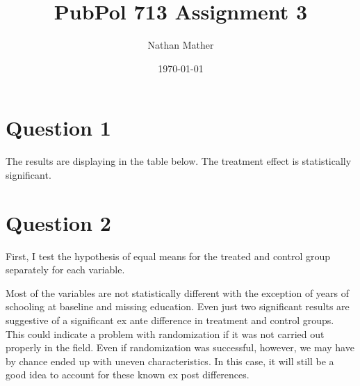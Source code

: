 \documentclass[11pt]{article}
\title{PubPol 713 Assignment 3} %
\author{Nathan Mather} %
\date{\today} %
\begin{document}
	
\maketitle %

\setcounter{tocdepth}{2} %


\section{ Question 1}

The results are displaying in the table below. The treatment effect is statistically significant. 

\begin{center}

	
	
\end{center}



\section{ Question 2}

First, I test the hypothesis of equal means for the treated and control group separately for each variable. 

\begin{center}
	\scalebox{0.80}{	
		
	}
\end{center}

Most of the variables are not statistically different with the exception of years of schooling at baseline and missing education. Even just two significant results are suggestive of a significant ex ante difference in treatment and control groups. This could indicate a problem with randomization if it was not carried out properly in the field. Even if randomization was successful, however, we may have by chance ended up with uneven characteristics. In this case, it will still be a good idea to account for these known ex post differences. \par 
\end{document}
